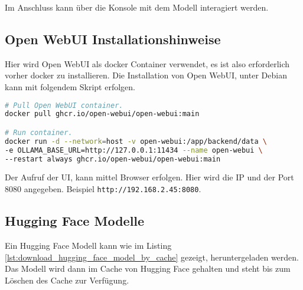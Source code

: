 Im Anschluss kann über die Konsole mit dem Modell interagiert werden.

\newpage

\subsection{Open WebUI Installationshinweise}\label{sec:open_webui}
Hier wird Open WebUI als docker Container verwendet, es ist also erforderlich vorher docker zu installieren. Die Installation von Open WebUI, unter Debian kann mit folgendem Skript erfolgen. 

\begin{lstlisting}[language=bash,caption={Open WebUI installieren}]
# Pull Open WebUI container.
docker pull ghcr.io/open-webui/open-webui:main

# Run container.
docker run -d --network=host -v open-webui:/app/backend/data \
-e OLLAMA_BASE_URL=http://127.0.0.1:11434 --name open-webui \
--restart always ghcr.io/open-webui/open-webui:main
\end{lstlisting}

Der Aufruf der UI, kann mittel Browser erfolgen. Hier wird die IP und der Port 8080 angegeben. Beispiel \texttt{http://192.168.2.45:8080}.

\newpage

\subsection{Hugging Face Modelle}\label{sec:hugging_face_models}
Ein Hugging Face Modell kann wie im Listing \ref{lst:download_hugging_face_model_by_cache} gezeigt, heruntergeladen werden. Das Modell wird dann im Cache von Hugging Face gehalten und steht bis zum Löschen des Cache zur Verfügung.

